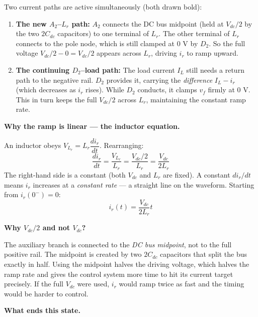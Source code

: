\documentclass[12pt, a4paper]{article}
\def\,{ }%
\newcommand{\Vdc}{V_{dc}}
\newcommand{\vf}{v_f}
\newcommand{\ir}{i_r}
\newcommand{\IL}{I_L}
\newcommand{\Lr}{L_r}
\begin{document}
Two current paths are active simultaneously (both drawn bold):
\begin{enumerate}
    \item \textbf{The new $A_2$--$\Lr$ path:}
          $A_2$ connects the DC bus midpoint (held at $\Vdc/2$ by the two
          $2C_{dc}$ capacitors) to one terminal of $\Lr$.
          The other terminal of $\Lr$ connects to the pole node, which is
          still clamped at 0\,V by $D_2$.
          So the full voltage $\Vdc/2 - 0 = \Vdc/2$ appears across $\Lr$,
          driving $\ir$ to ramp upward.

    \item \textbf{The continuing $D_2$--load path:}
          The load current $\IL$ still needs a return path to the negative
          rail.  $D_2$ provides it, carrying the \emph{difference}
          $\IL - \ir$ (which decreases as $\ir$ rises).
          While $D_2$ conducts, it clamps $\vf$ firmly at 0\,V.
          This in turn keeps the full $\Vdc/2$ across $\Lr$, maintaining
          the constant ramp rate.
\end{enumerate}

\medskip
\textbf{Why the ramp is linear — the inductor equation.}

An inductor obeys $V_{\Lr} = \Lr\,\dfrac{d\ir}{dt}$.
Rearranging:
\begin{equation}
    \frac{d\ir}{dt} = \frac{V_{\Lr}}{\Lr} = \frac{\Vdc/2}{\Lr}
                    = \frac{\Vdc}{2\Lr}
    \label{eq:boost_ramp}
\end{equation}
The right-hand side is a constant (both $\Vdc$ and $\Lr$ are fixed).
A constant $d\ir/dt$ means $\ir$ increases at a \emph{constant rate} ---
a straight line on the waveform.
Starting from $\ir(0^-) = 0$:
\begin{equation}
    \ir(t) = \frac{\Vdc}{2\Lr}\,t
    \label{eq:ir_ramp}
\end{equation}

\medskip
\textbf{Why $\Vdc/2$ and not $\Vdc$?}

The auxiliary branch is connected to the \emph{DC bus midpoint}, not to
the full positive rail.  The midpoint is created by two $2C_{dc}$
capacitors that split the bus exactly in half.
Using the midpoint halves the driving voltage, which halves the ramp rate
and gives the control system more time to hit its current target precisely.
If the full $\Vdc$ were used, $\ir$ would ramp twice as fast and the timing
would be harder to control.

\medskip
\textbf{What ends this state.}
\end{document}
